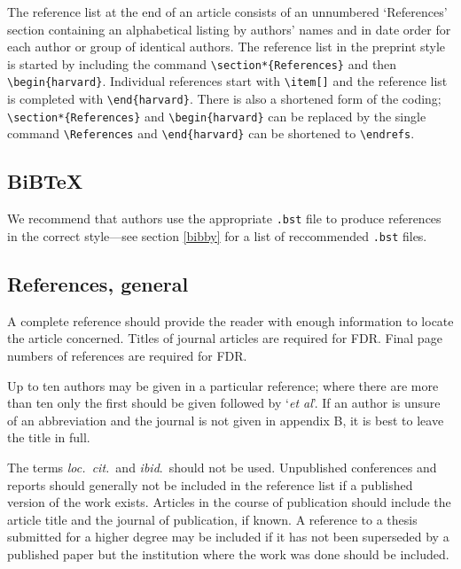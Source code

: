 \documentclass[12pt]{iopart}
\begin{document}
The reference list at the end of an article consists of an 
unnumbered `References' section containing an
alphabetical listing by authors' names and in date order for each 
author or group of identical authors. The reference list in the 
preprint style is started by including the command \verb"\section*{References}" and then
\verb"\begin{harvard}".
Individual references start with \verb"\item[]" and the reference list is completed with \verb"\end{harvard}".
There is also a shortened form of the coding; \verb"\section*{References}"
and \verb"\begin{harvard}" can be replaced by the single command
\verb"\References" and \verb"\end{harvard}" can be shortened to
\verb"\endrefs".

\subsection{BiBTeX\label{bibtex}}
We recommend that authors use the
appropriate \verb".bst" file to produce references in the correct style---see section \ref{bibby} for
a list of reccommended \verb".bst" files.

\subsection{References, general}
A complete reference should provide the reader with enough information to 
locate the article concerned. Titles of journal articles are required for FDR. Final page numbers of references are required for FDR.

Up to ten authors may be given in a particular reference; where 
there are more than ten only the first should be given followed by 
`{\it et al}'. If an author is unsure of an abbreviation and the 
journal is not given in appendix B, it is best to leave the title in full. 

The terms {\it loc.\ cit.}\ and {\it ibid}.\ should not be used. 
Unpublished conferences and reports should generally not be included 
in the reference list if a published version of the work exists. Articles in the course of publication should 
include the article title and the journal of publication, if known. 
A reference to a thesis submitted for a higher degree may be included 
if it has not been superseded by a published 
paper but the institution where the work was done should be included.
\end{document}
